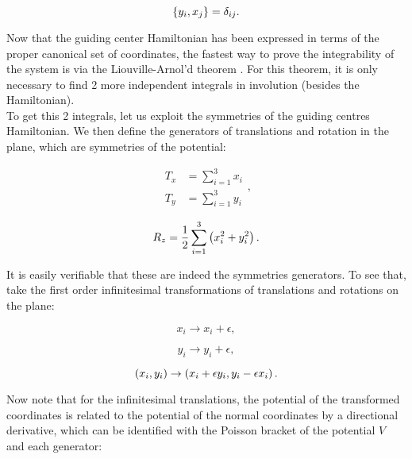 \begin{equation}
\left\lbrace y_i, x_j \right\rbrace = \delta_{ij}.
\label{lastpb}
\end{equation}

Now that the guiding center Hamiltonian has been expressed in terms of the proper canonical set of coordinates, the fastest way to prove the integrability of the system is via the Liouville-Arnol'd theorem \cite[Sect. 49]{arnold}. For this theorem, it is only necessary to find 2 more independent integrals in involution (besides the Hamiltonian).\\

To get this 2 integrals, let us exploit the symmetries of the guiding centres Hamiltonian. We then define the generators of translations and rotation in the plane, which are symmetries of the potential:

\begin{equation}
\begin{aligned}
T_x &= \sum_{i=1}^{3} x_i \\
T_y &= \sum_{i=1}^{3} y_i 
\end{aligned},
\label{eq:gentranslation}
\end{equation}

\begin{equation}
R_z = \frac{1}{2} \sum_{i=1}^{3} \left( x_i^2 + y_i^2 \right).
\label{eq:genrotation}
\end{equation}

It is easily verifiable that these are indeed the symmetries generators. To see that, take the first order infinitesimal transformations of translations and rotations on the plane:

\begin{equation*}
x_i  \rightarrow x_i + \epsilon ,
\end{equation*}

\begin{equation*}
y_i \rightarrow y_i + \epsilon ,
\end{equation*}

\begin{equation*}
\left( x_i,y_i \right) \rightarrow \left( x_i +\epsilon y_i, y_i - \epsilon x_i \right).
\end{equation*}

Now note that for the infinitesimal translations, the potential of the transformed coordinates is related to the potential of the normal coordinates by a directional derivative, which can be identified with the Poisson bracket of the potential $V$ and each generator:


